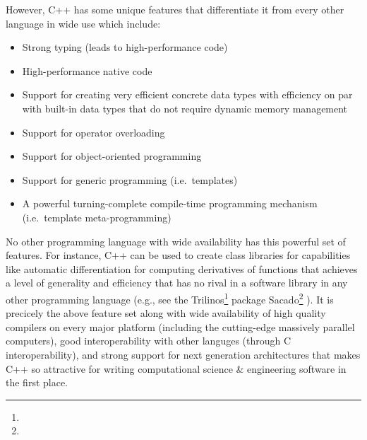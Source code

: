 \documentclass[pdf,ps2pdf,11pt]{SANDreport}
\begin{document}
However, C++ has some unique features that differentiate it from every
other language in wide use which include:

\begin{itemize}

{}\item Strong typing (leads to high-performance code)

{}\item High-performance native code

{}\item Support for creating very efficient concrete data types with
efficiency on par with built-in data types that do not require dynamic
memory management

{}\item Support for operator overloading

{}\item Support for object-oriented programming

{}\item Support for generic programming (i.e.\ templates)

{}\item A powerful turning-complete compile-time programming mechanism
(i.e.\ template meta-programming)

\end{itemize}

No other programming language with wide availability has this powerful
set of features.  For instance, C++ can be used to create class
libraries for capabilities like automatic differentiation
{}\cite{ref:ad} for computing derivatives of functions that achieves a
level of generality and efficiency that has no rival in a software
library in any other programming language (e.g., see the
Trilinos\footnote{} package
Sacado\footnote{}
{}\cite{phippsEtAl2006}).  It is precicely the above feature set along
with wide availability of high quality compilers on every major
platform (including the cutting-edge massively parallel computers),
good interoperability with other languges (through C
interoperability), and strong support for next generation
architectures {}\cite{DesignIssuesForMultiCore08} that makes C++ so
attractive for writing computational science \& engineering software
in the first place.
\end{document}
